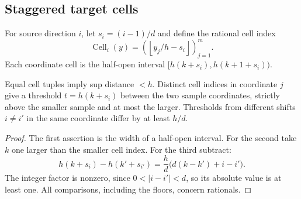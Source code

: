 \subsection{Staggered target cells}

For source direction $i$, let $s_i=(i-1)/d$ and define the rational cell index
\[
 \operatorname{Cell}_i(y)
   =\left(\left\lfloor y_j/h-s_i\right\rfloor\right)_{j=1}^m.
\]
Each coordinate cell is the half-open interval
$[h(k+s_i),h(k+1+s_i))$.

\begin{lemma}\label{lem:staggered-cells}
Equal cell tuples imply sup distance $<h$. Distinct cell indices in coordinate $j$ give a threshold $t=h(k+s_i)$ between the two sample coordinates, strictly above the smaller sample and at most the larger. Thresholds from different shifts $i\ne i'$ in the same coordinate differ by at least $h/d$.
\end{lemma}
\begin{proof}
The first assertion is the width of a half-open interval. For the second take $k$ one larger than the smaller cell index. For the third subtract:
\[
 h(k+s_i)-h(k'+s_{i'})
   =\frac hd\bigl(d(k-k')+i-i'\bigr).
\]
The integer factor is nonzero, since $0<|i-i'|<d$, so its absolute value is at least one. All comparisons, including the floors, concern rationals.
\end{proof}

